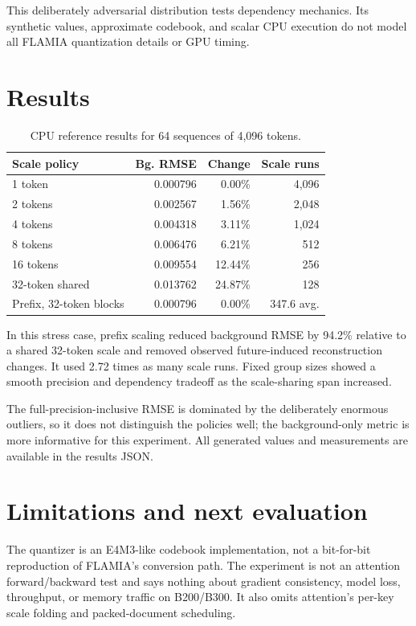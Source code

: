 \documentclass[10pt,twocolumn]{article}
\begin{document}
This deliberately adversarial distribution tests dependency mechanics. Its synthetic values, approximate codebook, and scalar CPU execution do not model all FLAMIA quantization details or GPU timing.

\section{Results}
\begin{table}[h]
\centering\small
\caption{CPU reference results for 64 sequences of 4,096 tokens.}
\begin{tabular}{lrrr}
\toprule
Scale policy & Bg. RMSE & Change & Scale runs\\
\midrule
1 token & 0.000796 & 0.00\% & 4,096\\
2 tokens & 0.002567 & 1.56\% & 2,048\\
4 tokens & 0.004318 & 3.11\% & 1,024\\
8 tokens & 0.006476 & 6.21\% & 512\\
16 tokens & 0.009554 & 12.44\% & 256\\
32-token shared & 0.013762 & 24.87\% & 128\\
Prefix, 32-token blocks & 0.000796 & 0.00\% & 347.6 avg.\\
\bottomrule
\end{tabular}
\end{table}

In this stress case, prefix scaling reduced background RMSE by 94.2\% relative to a shared 32-token scale and removed observed future-induced reconstruction changes. It used 2.72 times as many scale runs. Fixed group sizes showed a smooth precision and dependency tradeoff as the scale-sharing span increased.

The full-precision-inclusive RMSE is dominated by the deliberately enormous outliers, so it does not distinguish the policies well; the background-only metric is more informative for this experiment. All generated values and measurements are available in the results JSON.

\section{Limitations and next evaluation}
The quantizer is an E4M3-like codebook implementation, not a bit-for-bit reproduction of FLAMIA's conversion path. The experiment is not an attention forward/backward test and says nothing about gradient consistency, model loss, throughput, or memory traffic on B200/B300. It also omits attention's per-key scale folding and packed-document scheduling.
\end{document}
